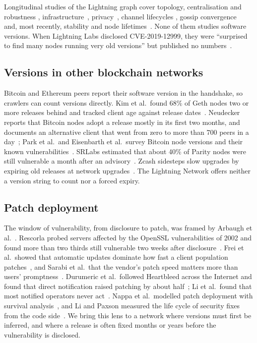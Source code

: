 Longitudinal studies of the Lightning graph cover topology, centralisation and robustness
\cite{rohrer2019discharged,seres2020topological,lin2020secondpath,martinazzi2020evolving,zabka2024centrality},
infrastructure~\cite{casas2021taproot}, privacy~\cite{romiti2021crosslayer}, channel lifecycles
\cite{grotschla2025lifecycle}, gossip convergence~\cite{gogge2023convergence} and, most recently, stability and node
lifetimes~\cite{valko2025geolocated,valko2025stability,valko2026lifetime}. None of them studies software versions.
When Lightning Labs disclosed CVE-2019-12999, they were ``surprised to find many nodes running very old versions''
but published no numbers~\cite{lightninglabs2019cve}.

\subsection{Versions in other blockchain networks}
Bitcoin and Ethereum peers report their software version in the handshake, so crawlers can count versions directly.
Kim et al.\ found 68\% of Geth nodes two or more releases behind and tracked client age against release
dates~\cite{kim2018ethereum}. Neudecker reports that Bitcoin nodes adopt a release mostly in its first two months,
and documents an alternative client that went from zero to more than 700 peers in a
day~\cite{neudecker2019characterization}; Park et al.\ and Eisenbarth et al.\ survey Bitcoin node versions and their
known vulnerabilities~\cite{park2019bitcoinnodes,eisenbarth2021bitcoin}. SRLabs estimated that about 40\% of Parity
nodes were still vulnerable a month after an advisory~\cite{srlabs2019patchgap}. Zcash sidesteps slow upgrades by
expiring old releases at network upgrades~\cite{daniel2019mapz}. The Lightning Network offers neither a version
string to count nor a forced expiry.

\subsection{Patch deployment}
The window of vulnerability, from disclosure to patch, was framed by Arbaugh et al.~\cite{arbaugh2000windows}.
Rescorla probed servers affected by the OpenSSL vulnerabilities of 2002 and found more than two thirds still
vulnerable two weeks after disclosure~\cite{rescorla2003securityholes}. Frei et al.\ showed that automatic
updates dominate how fast a client population patches~\cite{frei2009firefox}, and Sarabi et al.\ that the vendor's
patch speed matters more than users' promptness~\cite{sarabi2017patchme}. Durumeric et al.\ followed Heartbleed
across the Internet and found that direct notification raised patching by about half~\cite{durumeric2014heartbleed};
Li et al.\ found that most notified operators never act~\cite{li2016notifications}. Nappa et al.\ modelled patch
deployment with survival analysis~\cite{nappa2015clones}, and Li and Paxson measured the life cycle of security fixes
from the code side~\cite{li2017patches}. We bring this lens to a network where versions must first be inferred, and
where a release is often fixed months or years before the vulnerability is disclosed.
